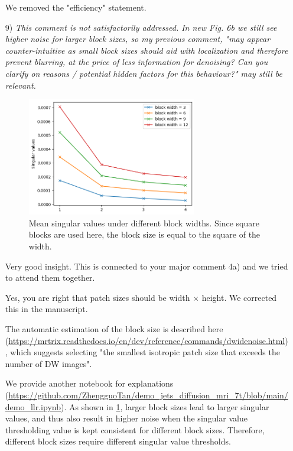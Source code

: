 \documentclass[a4paper,11pt,twoside]{report}
\begin{document}
\begin{enumerate}
    \hspace{1em} {\color{blue} We removed the "efficiency" statement.}

    \item [9)] \textit{This comment is not satisfactorily addressed. In new Fig. 6b we still see higher noise for larger block sizes, so my previous comment, "may appear counter-intuitive as small block sizes should aid with localization and therefore prevent blurring, at the price of less information for denoising? Can you clarify on reasons / potential hidden factors for this behaviour?" may still be relevant.}

    \begin{figure}
        \centering
        \includegraphics[width=0.7\textwidth]{singular_values.png}
        \caption{Mean singular values under different block widths.
        Since square blocks are used here, the block size is equal to
        the square of the width.}
        \label{FIG:SVAL}
    \end{figure}

    \hspace{1em} {\color{blue} Very good insight.
    This is connected to your major comment 4a)
    and we tried to attend them together.

    \hspace{1em} Yes, you are right that
    patch sizes should be width $\times$ height.
    We corrected this in the manuscript.

    \hspace{1em} The automatic estimation of the block size
    is described here (\url{https://mrtrix.readthedocs.io/en/dev/reference/commands/dwidenoise.html}),
    which suggests selecting "the smallest isotropic patch size
    that exceeds the number of DW images".

    \hspace{1em} We provide another notebook for explanations (\url{https://github.com/ZhengguoTan/demo_jets_diffusion_mri_7t/blob/main/demo_llr.ipynb}).
    As shown in \cref{FIG:SVAL}, larger block sizes lead to
    larger singular values, and thus also result in higher noise
    when the singular value thresholding value is kept consistent
    for different block sizes. Therefore, different block sizes require
    different singular value thresholds.
    }


\end{enumerate}
\end{document}

